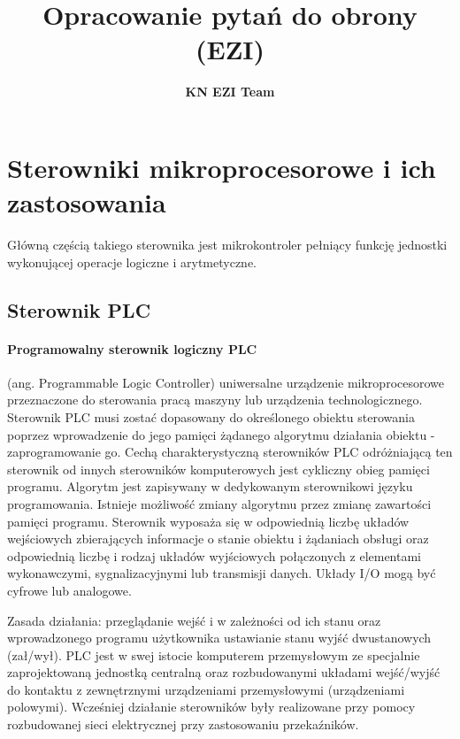 \documentclass[a4paper,twoside]{report}
\author{\textbf{KN EZI Team}}
\title{Opracowanie pytań do obrony (EZI)}
\begin{document}
\maketitle
\tableofcontents %
\thispagestyle{empty}
\newpage

\bigskip
\section{Sterowniki mikroprocesorowe i ich zastosowania}

Główną częścią takiego sterownika jest mikrokontroler pełniący funkcję jednostki wykonującej operacje logiczne i arytmetyczne.

\subsection{Sterownik PLC}

\paragraph{Programowalny sterownik logiczny PLC} (ang. Programmable Logic Controller) uniwersalne urządzenie mikroprocesorowe przeznaczone do sterowania pracą maszyny lub urządzenia technologicznego. Sterownik PLC musi zostać dopasowany do określonego obiektu sterowania poprzez wprowadzenie do jego pamięci żądanego algorytmu działania obiektu - zaprogramowanie go. Cechą charakterystyczną sterowników PLC odróżniającą ten sterownik od innych sterowników komputerowych jest cykliczny obieg pamięci programu. Algorytm jest zapisywany w dedykowanym sterownikowi języku programowania. Istnieje możliwość zmiany algorytmu przez zmianę zawartości pamięci programu. Sterownik wyposaża się w odpowiednią liczbę układów wejściowych zbierających informacje o stanie obiektu i żądaniach obsługi oraz odpowiednią liczbę i rodzaj układów wyjściowych połączonych z elementami wykonawczymi, sygnalizacyjnymi lub transmisji danych. Układy I/O mogą być cyfrowe lub analogowe.

Zasada działania: przeglądanie wejść i w zależności od ich stanu oraz
wprowadzonego programu użytkownika ustawianie stanu wyjść dwustanowych (zał/wył).
PLC jest w swej istocie komputerem przemysłowym ze specjalnie zaprojektowaną jednostką centralną oraz rozbudowanymi układami wejść/wyjść do kontaktu z zewnętrznymi urządzeniami przemysłowymi (urządzeniami polowymi). Wcześniej działanie sterowników były realizowane przy pomocy rozbudowanej sieci elektrycznej przy zastosowaniu przekaźników.
\end{document}
